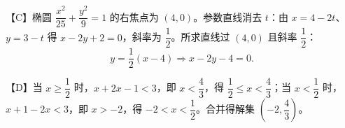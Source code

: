 \begin{answer}
【C】椭圆 $\dfrac{x^2}{25}+\dfrac{y^2}9=1$ 的右焦点为 $(4,0)$。参数直线消去 $t$：由 $x=4-2t$、$y=3-t$ 得 $x-2y+2=0$，斜率为 $\dfrac12$。所求直线过 $(4,0)$ 且斜率 $\dfrac12$：
\nopagebreak[4]
\[y=\frac12(x-4)\Longrightarrow x-2y-4=0.\]

【D】当 $x\geqslant\dfrac12$ 时，$x+2x-1<3$，即 $x<\dfrac43$，得 $\dfrac12\leqslant x<\dfrac43$；当 $x<\dfrac12$ 时，$x+1-2x<3$，即 $x>-2$，得 $-2<x<\dfrac12$。合并得解集 $\left(-2,\dfrac43\right)$。


\end{answer}

